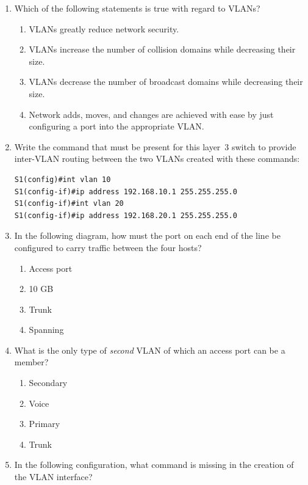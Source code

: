 \begin{enumerate}
\item
  Which of the following statements is true with regard to VLANs?

  \begin{enumerate}
  \tightlist
  \item
    VLANs greatly reduce network security.
  \item
    VLANs increase the number of collision domains while decreasing
    their size.
  \item
    VLANs decrease the number of broadcast domains while decreasing
    their size.
  \item
    Network adds, moves, and changes are achieved with ease by just
    configuring a port into the appropriate VLAN.
  \end{enumerate}
\item
  Write the command that must be present for this layer~3 switch to
  provide inter-VLAN routing between the two VLANs created with these
  commands:

\begin{verbatim}
S1(config)#int vlan 10
S1(config-if)#ip address 192.168.10.1 255.255.255.0
S1(config-if)#int vlan 20
S1(config-if)#ip address 192.168.20.1 255.255.255.0
\end{verbatim}
\item
  In the following diagram, how must the port on each end of the line be
  configured to carry traffic between the four hosts?

  \begin{figure}
  \centering
  \caption{}
  \end{figure}

  \begin{enumerate}
  \tightlist
  \item
     Access port
  \item
    10 GB
  \item
    Trunk
  \item
    Spanning
  \end{enumerate}
\item
  What is the only type of \emph{second} VLAN of which an access port
  can be a member?

  \begin{enumerate}
  \tightlist
  \item
    Secondary
  \item
    Voice
  \item
    Primary
  \item
    Trunk
  \end{enumerate}
\item
  In the following configuration, what command is missing in the
  creation of the VLAN interface?


\end{enumerate}
